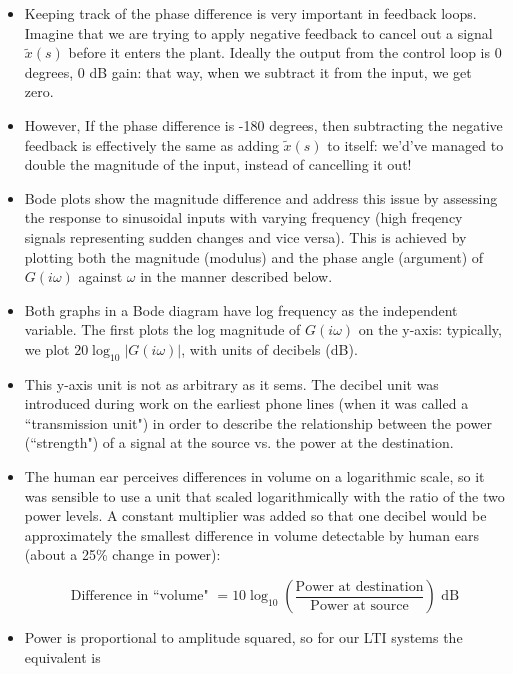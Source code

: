 \documentclass{article}
\begin{document}
\begin{itemize}
\item Keeping track of the phase difference is very important in feedback loops. Imagine that we are trying to apply negative feedback to cancel out a signal $\tilde{x}(s)$ before it enters the plant. Ideally the output from the control loop is 0 degrees, 0 dB gain: that way, when we subtract it from the input, we get zero.

\item However, If the phase difference is -180 degrees, then subtracting the negative feedback is effectively the same as adding $\tilde{x}(s)$ to itself: we'd've managed to double the magnitude of the input, instead of cancelling it out!

\item Bode plots show the magnitude difference and 
address this issue by assessing the response to sinusoidal inputs with varying frequency (high freqency signals representing sudden changes and vice versa). This is achieved by plotting both the magnitude (modulus) and the phase angle (argument) of $G(i\omega)$ against $\omega$ in the manner described below.

\item Both graphs in a Bode diagram have log frequency as the independent variable. The first plots the log magnitude of $G(i\omega)$ on the y-axis: typically, we plot $20 \log_{10} | G(i \omega) |$, with units of decibels (dB).

\item This y-axis unit is not as arbitrary as it sems. The decibel unit was introduced during work on the earliest phone lines (when it was called a ``transmission unit") in order to describe the relationship between the power (``strength") of a signal at the source vs. the power at the destination.

\item The human ear perceives differences in volume on a logarithmic scale, so it was sensible to use a unit that scaled logarithmically with the ratio of the two power levels. A constant multiplier was added so that one decibel would be approximately the smallest difference in volume detectable by human ears (about a 25\% change in power):

\[ \textrm{Difference in ``volume" } = 10 \log_{10} \left( \frac{\textrm{Power at destination}}{\textrm{Power at source}} \right) \textrm{ dB} \]

\item Power is proportional to amplitude squared, so for our LTI systems the equivalent is


\end{itemize}
\end{document}
